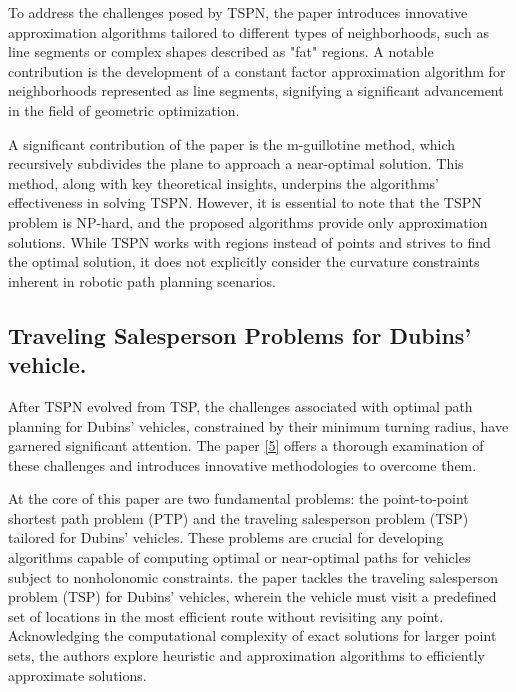 \vspace*{6mm}

To address the challenges posed by TSPN, the paper introduces innovative approximation algorithms tailored to different types of neighborhoods, such as line segments or complex shapes described as "fat" regions. A notable contribution is the development of a constant factor approximation algorithm for neighborhoods represented as line segments, signifying a significant advancement in the field of geometric optimization.

\vspace*{6mm}

A significant contribution of the paper is the m-guillotine method, which recursively subdivides the plane to approach a near-optimal solution. This method, along with key theoretical insights, underpins the algorithms' effectiveness in solving TSPN. However, it is essential to note that the TSPN problem is NP-hard, and the proposed algorithms provide only approximation solutions. While TSPN works with regions instead of points and strives to find the optimal solution, it does not explicitly consider the curvature constraints inherent in robotic path planning scenarios.











\subsection{Traveling Salesperson Problems for Dubins’ vehicle.}



After TSPN evolved from TSP, the challenges associated with optimal path planning for Dubins' vehicles, constrained by their minimum turning radius, have garnered significant attention. The paper \hyperlink{cite.TSP_with_dubins}{[5]} offers a thorough examination of these challenges and introduces innovative methodologies to overcome them.

\vspace*{6mm}


At the core of this paper are two fundamental problems: the point-to-point shortest path problem (PTP) and the traveling salesperson problem (TSP) tailored for Dubins’ vehicles. These problems are crucial for developing algorithms capable of computing optimal or near-optimal paths for vehicles subject to nonholonomic constraints. the paper tackles the traveling salesperson problem (TSP) for Dubins’ vehicles, wherein the vehicle must visit a predefined set of locations in the most efficient route without revisiting any point. Acknowledging the computational complexity of exact solutions for larger point sets, the authors explore heuristic and approximation algorithms to efficiently approximate solutions.

